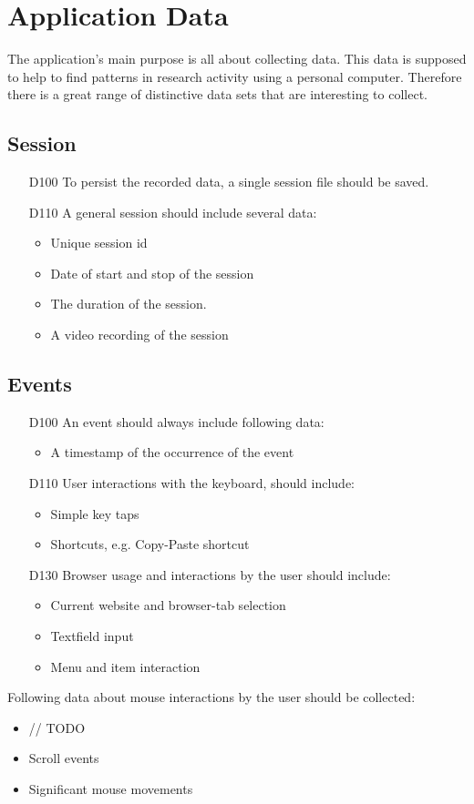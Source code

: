 \chapter{Application Data}
\label{ch:data}

The application's main purpose is all about collecting data. This data is supposed to help to find patterns in research activity using a personal computer. Therefore there is a great range of distinctive data sets that are interesting to collect.

\section{Session}
\begin{itemize}
\item[D100] To persist the recorded data, a single session file should be saved.

\item[D110] A general session should include several data:
	\begin{itemize}
	\item Unique session id
	\item Date of start and stop of the session
	\item The duration of the session.
	\item A video recording of the session
	\end{itemize}
\end{itemize}

\section{Events}
\begin{itemize}
\item[D100] An event should always include following data:
	\begin{itemize}
	\item A timestamp of the occurrence of the event
	\end{itemize}

\item[D110] User interactions with the keyboard, should include:
	\begin{itemize}
	\item Simple key taps
	\item Shortcuts, e.g. Copy-Paste shortcut
	\end{itemize}

\item[D130] Browser usage and interactions by the user should include:
	\begin{itemize}
	\item Current website and browser-tab selection
	\item Textfield input
	\item Menu and item interaction
	\end{itemize}
\end{itemize}

\item[D140] Following data about mouse interactions by the user should be collected:
	\begin{itemize}
	\item // TODO
	\item Scroll events
	\item Significant mouse movements
	\end{itemize}